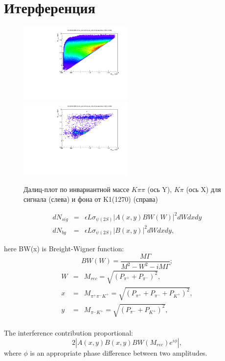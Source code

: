 \documentclass[unicode]{beamer}
\newcommand{\pipi}{\pi^{+}\pi^{-}}
\begin{document}
\section{Итерференция}
\begin{frame}

\begin{figure}
\begin{center}
  \includegraphics[width=0.5\textwidth]{fig/dalitz-KK2.pdf}
  \hfill
  \includegraphics[width=0.5\textwidth]{fig/dalitz-bg2.pdf}
	\caption{Далиц-плот по инвариантной массе $K\pi\pi$ (ось Y), $K\pi$ (ось X) для сигнала (слева) и фона от K1(1270) (справа) }
\end{center}
\end{figure}

\end{frame}

\begin{frame}
	\small
\begin{eqnarray}
  dN_{sig} & = & \epsilon L \sigma_{\psi(2S)} |A(x, y) BW(W)|^2  dW dx dy \\
  dN_{bg} & = & \epsilon L \sigma_{\psi(2S)}  |B(x, y)|^2  dW dx dy,
\end{eqnarray}

here BW(x) is Breight-Wigner function:
\begin{equation}
  BW(W) =  \frac{M \Gamma}{M^2-W^2 - iM\Gamma};
\end{equation}
\begin{eqnarray}
W & = & M_{rec} = \sqrt{(P_{\pi^+}+ P_{\pi^-})^2}, \nonumber \\
x & = & M_{\pipi K^+} = \sqrt{(P_{\pi^+}+ P_{\pi^-} + P_{K^+})^2}, \nonumber \\ 
y & = & M_{\pi^- K^+} = \sqrt{(P_{\pi^-} + P_{K^+})^2}, \nonumber \\
\end{eqnarray}



The interference contribution proportional:
\begin{equation}
	2 |A(x,y) B(x,y) BW(M_{rec}) e^{i\phi}|,
\end{equation}
where $\phi$ is an appropriate phase difference between two amplitudes.


\end{frame}
\end{document}

